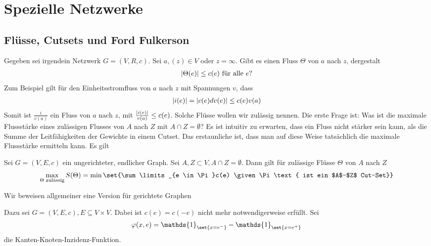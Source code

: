 
\chapter{Spezielle Netzwerke}
\label{chap:SpezielleNetzwerke}
\section{Flüsse, Cutsets und Ford Fulkerson}
Gegeben sei irgendein Netzwerk $G = (V,R,c).$ Sei $a,(z) \in V$ oder $z = \infty$. Gibt es einen Fluss $\Theta$ von $a$ nach $z$, dergestalt
\begin{gather}
	\lvert\Theta(e)\rvert \leq c(e)  \text{ für alle } e?
\end{gather}
Zum Beispiel gilt für den Einheitsstromfluss von $a$ nach $z$ mit Spannungen $v$, dass 
\begin{align}
	\lvert i(e)\rvert = \lvert c(e) dv(e)\rvert \leq c(e)v(a)
\end{align}
Somit ist $\frac{i}{v(a)}$ ein Fluss von $a$ nach $z$, mit $\frac{\lvert i(e)\rvert}{v(a)} \leq c(e)$. Solche Flüsse wollen wir zulässig nennen.
Die erste Frage ist: Was ist die maximale Flussstärke eines zulässigen Flusses von $A$ nach $Z$ mit $A \cap Z = \emptyset$?
Es ist intuitiv zu erwarten, dass ein Fluss nicht stärker sein kann, als die Summe der Leitfähigkeiten der Gewichte in einem Cutset.  Das erstaunliche ist, dass man auf diese Weise tatsächlich die maximale Flussstärke ermitteln kann. Es gilt

\begin{satz}
	Sei $G = (V,E,c)$ ein ungerichteter, endlicher Graph. Sei $A,Z \subset V, A \cap Z = \emptyset$. Dann gilt für zulässige Flüsse $\Theta$ von $A$ nach $Z$
	\begin{align}
		\max\limits_{\Theta \text{ zulässig}} S(\Theta) = \min \set{\sum\limits_{e \in \Pi}c(e) \given \Pi \text{ ist ein $A$--$Z$ Cut--Set}}
	\end{align}
\end{satz}
Wir beweisen allgemeiner eine Version für gerichtete Graphen
\begin{beweis}
	Dazu sei $G = (V,E,c), E \subseteq V \times V$. Dabei ist $c(e) = c(-e)$ nicht mehr notwendigerweise erfüllt. Sei
	\begin{align}
		\phi (x,e) = \mathds{1}_{\set{x = e^-}}- \mathds{1}_{\set{x = e^+}}
	\end{align}
	die Kanten-Knoten-Inzidenz-Funktion.

\end{beweis}

